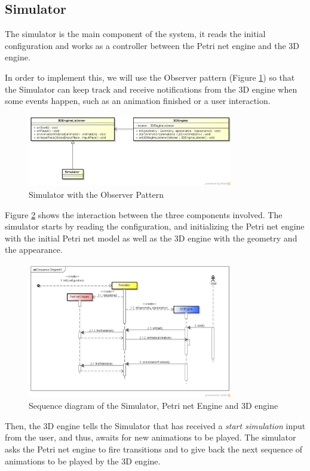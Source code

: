 \subsection{Simulator}

The simulator is the main component of the system, it reads the initial configuration and works as a controller between the Petri net engine and the 3D engine.

In order to implement this, we will use the Observer pattern (Figure \ref{fig:observer-pattern}) so that the Simulator can keep track and receive notifications from the 3D engine when some events happen, such as an animation finished or a user interaction.

\begin{figure}[htp]
\begin{center}
  \includegraphics[width=0.8\textwidth]{image/ObserverPattern.png}
  \caption{Simulator with the Observer Pattern}
  \label{fig:observer-pattern}
\end{center}
\end{figure}

Figure \ref{fig:sd-engines} shows the interaction between the three components involved. The simulator starts by reading the configuration, and initializing the Petri net engine with the initial Petri net model as well as the 3D engine with the geometry and the appearance. 

\begin{figure}[htp]
\begin{center}
  \includegraphics[width=0.8\textwidth]{image/sd-engines.png}
  \caption{Sequence diagram of the Simulator, Petri net Engine and 3D engine}
  \label{fig:sd-engines}
\end{center}
\end{figure}

Then, the 3D engine tells the Simulator that has received a \textit{start simulation} input from the user, and thus, awaits for new animations to be played. The simulator asks the Petri net engine to fire transitions and to give back the next sequence of animations to be played by the 3D engine.